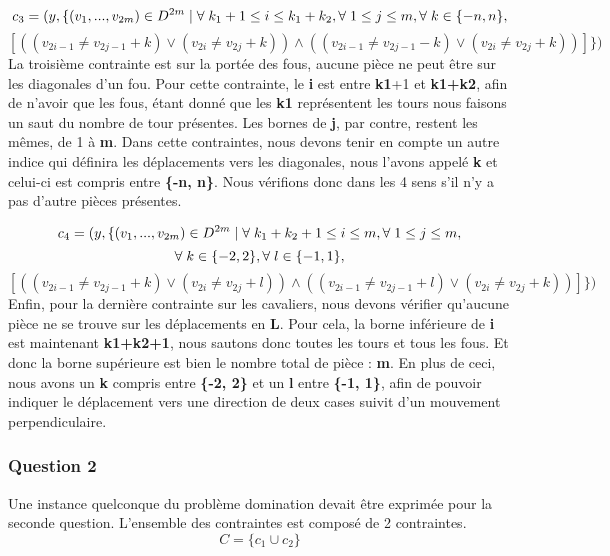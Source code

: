 \documentclass{article}
\begin{document}
  $$c_{3} = ( y, \{ (v_{1}, ..., v_{2m}) \in  D^{2m} \mid \forall \hspace{0.1cm}  k_{1}+1\leq i \leq k_{1}+k_{2}, \forall \hspace{0.1cm} 1\leq j \leq m, \forall \hspace{0.1cm} k \in \{-n, n \}, $$
  $$[ ((v_{2i-1} \neq v_{2j-1}+k) \vee  (v_{2i} \neq v_{2j}+k)) \wedge  ((v_{2i-1} \neq v_{2j-1}-k) \vee  (v_{2i} \neq v_{2j}+k)) ] \})$$
La troisième contrainte est sur la portée des fous, aucune pièce ne peut être sur les diagonales d'un fou. Pour cette contrainte, le \textbf{i} est entre \textbf{k1}+1 et \textbf{k1+k2}, afin de n'avoir que les fous, étant donné que les \textbf{k1} représentent les tours nous faisons un saut du nombre de tour présentes. Les bornes de \textbf{j}, par contre, restent les mêmes, de 1 à \textbf{m}. Dans cette contraintes, nous devons tenir en compte un autre indice qui définira les déplacements vers les diagonales, nous l'avons appelé \textbf{k} et celui-ci est compris entre \textbf{\{-n, n\}}.  Nous vérifions donc dans les 4 sens s'il n'y a pas d'autre pièces présentes.

 $$ c_{4} = ( y, \{ (v_{1}, ..., v_{2m}) \in  D^{2m} \mid \forall \hspace{0.1cm} k_{1}+k_{2}+1\leq i \leq m, \forall \hspace{0.1cm} 1\leq j \leq m,$$ $$\forall \hspace{0.1cm} k \in \{-2, 2\}, \forall \hspace{0.1cm}l \in \{-1, 1\},$$
  $$[((v_{2i-1} \neq v_{2j-1}+k) \vee  (v_{2i} \neq v_{2j}+l)) \wedge ((v_{2i-1} \neq v_{2j-1}+l) \vee  (v_{2i} \neq v_{2j}+k)) ] \})$$
Enfin, pour la dernière contrainte sur les cavaliers, nous devons vérifier qu'aucune pièce ne se trouve sur les déplacements en \textbf{L}. Pour cela, la borne inférieure de \textbf{i} est maintenant \textbf{k1+k2+1}, nous sautons donc toutes les tours et tous les fous. Et donc la borne supérieure est bien le nombre total de pièce : \textbf{m}. En plus de ceci, nous avons un \textbf{k} compris entre \textbf{\{-2, 2\}} et un \textbf{l} entre \textbf{\{-1, 1\}}, afin de pouvoir indiquer le déplacement vers une direction de deux cases suivit d'un mouvement perpendiculaire. 

\subsubsection{Question 2}
Une instance quelconque du problème domination devait être exprimée pour la seconde question. L'ensemble des contraintes est composé de 2 contraintes.
$$C = \{c_{1} \cup c_{2}\} $$
\end{document}
